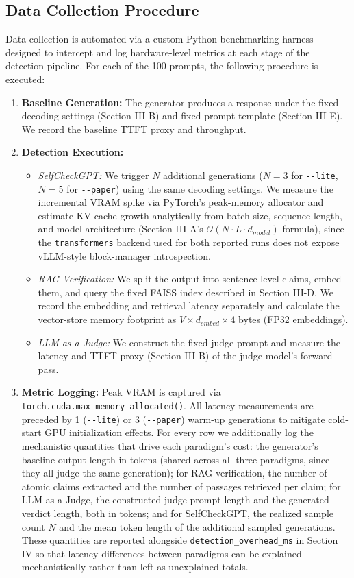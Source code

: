 \documentclass[conference]{IEEEtran}
\begin{document}
\subsection{Data Collection Procedure}

Data collection is automated via a custom Python benchmarking harness designed to intercept and log hardware-level metrics at each stage of the detection pipeline. For each of the 100 prompts, the following procedure is executed:

\begin{enumerate}
    \item \textbf{Baseline Generation:} The generator produces a response under the fixed decoding settings (Section III-B) and fixed prompt template (Section III-E). We record the baseline TTFT proxy and throughput.
    \item \textbf{Detection Execution:}
    \begin{itemize}
        \item \textit{SelfCheckGPT:} We trigger $N$ additional generations ($N=3$ for \texttt{-{}-lite}, $N=5$ for \texttt{-{}-paper}) using the same decoding settings. We measure the incremental VRAM spike via PyTorch's peak-memory allocator and estimate KV-cache growth analytically from batch size, sequence length, and model architecture (Section III-A's $\mathcal{O}(N \cdot L \cdot d_{model})$ formula), since the \texttt{transformers} backend used for both reported runs does not expose vLLM-style block-manager introspection.
        \item \textit{RAG Verification:} We split the output into sentence-level claims, embed them, and query the fixed FAISS index described in Section III-D. We record the embedding and retrieval latency separately and calculate the vector-store memory footprint as $V \times d_{embed} \times 4$ bytes (FP32 embeddings).
        \item \textit{LLM-as-a-Judge:} We construct the fixed judge prompt and measure the latency and TTFT proxy (Section III-B) of the judge model's forward pass.
    \end{itemize}
    \item \textbf{Metric Logging:} Peak VRAM is captured via \texttt{torch.cuda.max\_memory\_allocated()}. All latency measurements are preceded by 1 (\texttt{-{}-lite}) or 3 (\texttt{-{}-paper}) warm-up generations to mitigate cold-start GPU initialization effects. For every row we additionally log the mechanistic quantities that drive each paradigm's cost: the generator's baseline output length in tokens (shared across all three paradigms, since they all judge the same generation); for RAG verification, the number of atomic claims extracted and the number of passages retrieved per claim; for LLM-as-a-Judge, the constructed judge prompt length and the generated verdict length, both in tokens; and for SelfCheckGPT, the realized sample count $N$ and the mean token length of the additional sampled generations. These quantities are reported alongside \texttt{detection\_overhead\_ms} in Section IV so that latency differences between paradigms can be explained mechanistically rather than left as unexplained totals.

\end{enumerate}
\end{document}
